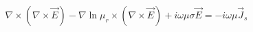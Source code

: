 \begin{equation}
    \nabla \times (\nabla \times \vec{E}) - \nabla \ln \mu_r \times (\nabla \times \vec{E}) + i \omega \mu \sigma \vec{E} = -i\omega \mu \vec{J}_s
\label{eq:permeability-fdem}
\end{equation}
